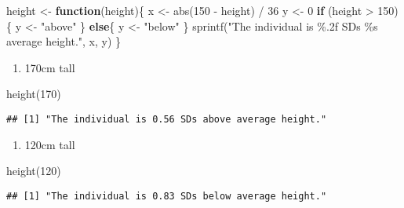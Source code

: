 \documentclass[
]{article}
\newenvironment{Shaded}{\begin{snugshade}}{\end{snugshade}}
\newcommand{\ControlFlowTok}[1]{\textcolor[rgb]{0.13,0.29,0.53}{\textbf{#1}}}
\newcommand{\DecValTok}[1]{\textcolor[rgb]{0.00,0.00,0.81}{#1}}
\newcommand{\FunctionTok}[1]{\textcolor[rgb]{0.00,0.00,0.00}{#1}}
\newcommand{\NormalTok}[1]{#1}
\newcommand{\OtherTok}[1]{\textcolor[rgb]{0.56,0.35,0.01}{#1}}
\newcommand{\SpecialCharTok}[1]{\textcolor[rgb]{0.00,0.00,0.00}{#1}}
\newcommand{\StringTok}[1]{\textcolor[rgb]{0.31,0.60,0.02}{#1}}
\providecommand{\tightlist}{%
  \setlength{\itemsep}{0pt}\setlength{\parskip}{0pt}}
\begin{document}
\begin{Shaded}
\begin{Highlighting}[]
\NormalTok{height }\OtherTok{\textless{}{-}} \ControlFlowTok{function}\NormalTok{(height)\{}
\NormalTok{  x }\OtherTok{\textless{}{-}}  \FunctionTok{abs}\NormalTok{(}\DecValTok{150} \SpecialCharTok{{-}}\NormalTok{ height) }\SpecialCharTok{/} \DecValTok{36}
\NormalTok{  y }\OtherTok{\textless{}{-}} \DecValTok{0}
  \ControlFlowTok{if}\NormalTok{ (height }\SpecialCharTok{\textgreater{}} \DecValTok{150}\NormalTok{)\{}
\NormalTok{    y }\OtherTok{\textless{}{-}}  \StringTok{"above"}
\NormalTok{  \}}
  \ControlFlowTok{else}\NormalTok{\{}
\NormalTok{    y }\OtherTok{\textless{}{-}}  \StringTok{"below"}
\NormalTok{  \}}
  \FunctionTok{sprintf}\NormalTok{(}\StringTok{"The individual is \%.2f SDs \%s average height."}\NormalTok{, x, y)}
\NormalTok{\}}
\end{Highlighting}
\end{Shaded}

\begin{enumerate}
\def\labelenumi{\roman{enumi})}
\tightlist
\item
  170cm tall
\end{enumerate}

\begin{Shaded}
\begin{Highlighting}[]
\FunctionTok{height}\NormalTok{(}\DecValTok{170}\NormalTok{)}
\end{Highlighting}
\end{Shaded}

\begin{verbatim}
## [1] "The individual is 0.56 SDs above average height."
\end{verbatim}

\begin{enumerate}
\def\labelenumi{\roman{enumi})}
\setcounter{enumi}{1}
\tightlist
\item
  120cm tall
\end{enumerate}

\begin{Shaded}
\begin{Highlighting}[]
\FunctionTok{height}\NormalTok{(}\DecValTok{120}\NormalTok{)}
\end{Highlighting}
\end{Shaded}

\begin{verbatim}
## [1] "The individual is 0.83 SDs below average height."
\end{verbatim}
\end{document}
